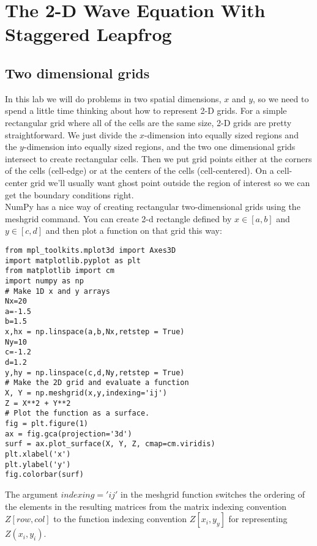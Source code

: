 
\chapter*{The 2-D Wave Equation With Staggered Leapfrog}
\section*{Two dimensional grids}

In this lab we will do problems in two spatial dimensions, $x$ and $y$, so we need
to spend a little time thinking about how to represent 2-D grids. For a simple
rectangular grid where all of the cells are the same size, 2-D grids are pretty
straightforward. We just divide the $x$-dimension into equally sized regions and
the $y$-dimension into equally sized regions, and the two one dimensional grids
intersect to create rectangular cells. Then we put grid points either at the corners
of the cells (cell-edge) or at the centers of the cells (cell-centered). On a cell-center
grid we\rq ll usually want ghost point outside the region of interest so we can get the
boundary conditions right. \\ NumPy has a nice way of creating rectangular two-dimensional grids using
the meshgrid command. You can create 2-d rectangle defined by $x \in [a,b]$ and
$y \in [c,d]$ and then plot a function on that grid this way:
\begin{lstlisting}
from mpl_toolkits.mplot3d import Axes3D
import matplotlib.pyplot as plt
from matplotlib import cm
import numpy as np
# Make 1D x and y arrays
Nx=20
a=-1.5
b=1.5
x,hx = np.linspace(a,b,Nx,retstep = True)
Ny=10
c=-1.2
d=1.2
y,hy = np.linspace(c,d,Ny,retstep = True)
# Make the 2D grid and evaluate a function
X, Y = np.meshgrid(x,y,indexing='ij')
Z = X**2 + Y**2
# Plot the function as a surface.
fig = plt.figure(1)
ax = fig.gca(projection='3d')
surf = ax.plot_surface(X, Y, Z, cmap=cm.viridis)
plt.xlabel('x')
plt.ylabel('y')
fig.colorbar(surf)
\end{lstlisting}
The argument $indexing='ij'$ in the meshgrid function switches the ordering
of the elements in the resulting matrices from the matrix indexing convention
$Z[row,col]$ to the function indexing convention $Z[x_i,y_y]$ for representing $Z(x_i, y_i)$.

